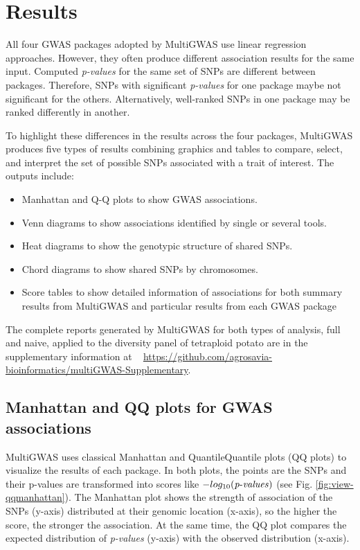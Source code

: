 \documentclass{article}
\begin{document}
\section{Results}
All four GWAS packages adopted by MultiGWAS use linear regression approaches. However, they often produce different association results for the same input. Computed \emph{p-values }for the same set of SNPs are different between packages. Therefore, SNPs with significant \emph{p-values} for one package maybe not significant for the others. Alternatively, well-ranked SNPs in one package may be ranked differently in another. 

To highlight these differences in the results across the four packages, MultiGWAS produces five types of results combining graphics and tables to compare, select, and interpret the set of possible SNPs associated with a trait of interest. The outputs include: 
\begin{itemize}
\item Manhattan and Q-Q plots to show GWAS associations. 
\item Venn diagrams to show associations identified by single or several tools.
\item Heat diagrams to show the genotypic structure of shared SNPs.
\item Chord diagrams to show shared SNPs by chromosomes.
\item Score tables to show detailed information of associations for both summary results from MultiGWAS and particular results from each GWAS
package
\end{itemize}

The complete reports generated by MultiGWAS for both types of analysis, full and naive, applied to the diversity panel of tetraploid potato are in the supplementary information at ~ \url{https://github.com/agrosavia-bioinformatics/multiGWAS-Supplementary}.



\subsection{Manhattan and QQ plots for GWAS associations }

MultiGWAS uses classical Manhattan and Quantile\textendash Quantile plots (QQ plots) to visualize the results of each package. In both plots, the points are the SNPs and their p-values are transformed into scores like $-log_{10}({\operatorname{\mathit{p-values}}})$ (see Fig. \ref{fig:view-qqmanhattan}). The Manhattan plot shows the strength of association of the SNPs (y-axis) distributed at their genomic location (x-axis), so the higher the score, the stronger the association. At the same time, the QQ plot compares the expected distribution of \emph{p-values} (y-axis) with the observed distribution (x-axis).
\end{document}
